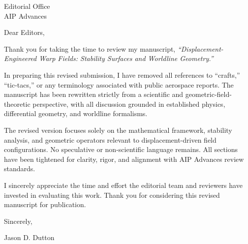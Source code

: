 \documentclass[11pt]{letter}
\begin{document}
\begin{letter}{Editorial Office\\AIP Advances}

\opening{Dear Editors,}

Thank you for taking the time to review my manuscript,
\textit{``Displacement-Engineered Warp Fields: Stability Surfaces and Worldline Geometry.''}

In preparing this revised submission, I have removed all references to
``crafts,'' ``tic-tacs,'' or any terminology associated with public
aerospace reports. The manuscript has been rewritten strictly from a
scientific and geometric-field-theoretic perspective, with all discussion
grounded in established physics, differential geometry, and worldline
formalisms.

The revised version focuses solely on the mathematical framework,
stability analysis, and geometric operators relevant to displacement-driven
field configurations. No speculative or non-scientific language remains.
All sections have been tightened for clarity, rigor, and alignment with
AIP Advances review standards.

I sincerely appreciate the time and effort the editorial team and
reviewers have invested in evaluating this work. Thank you for considering
this revised manuscript for publication.

\closing{Sincerely,}

\vspace{1em}
Jason D. Dutton

\end{letter}
\end{document}
